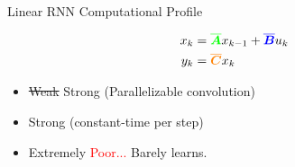 

    


\begin{frame}{Linear RNN Computational Profile}

    \begin{align*}
    x_{k} &= \textcolor{green}{\boldsymbol{\overline{A}}} \textcolor{black}{{x}_{k-1}} + \textcolor{blue}{\boldsymbol{\overline{B}}} \textcolor{black}{u_k} \\ 
    y_k &=  \textcolor{orange}{\boldsymbol{\overline{C}}} x_{k \phantom{- 1}}
    \end{align*}
\begin{itemize}
    \item {} \sout{Weak} Strong (Parallelizable convolution)
    \item {} Strong (constant-time per step) \pause
    \item {} Extremely \textcolor{red}{Poor...} Barely learns.
\end{itemize}
\end{frame}

